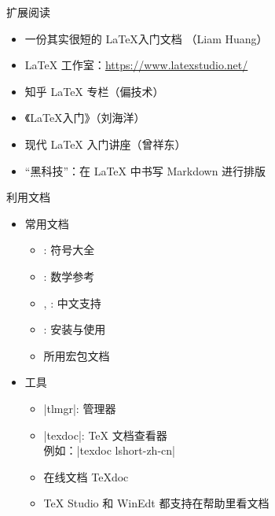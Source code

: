 \begin{frame}{扩展阅读}
  \begin{itemize}
    \item 一份其实很短的 \LaTeX 入门文档 （Liam Huang） 
    \item \LaTeX{} 工作室：\url{https://www.latexstudio.net/}
    \item 知乎 \LaTeX{} 专栏（偏技术）
    \item 《\LaTeX{}入门》（刘海洋）
    \item 现代 LaTeX 入门讲座（曾祥东）
    \item “黑科技”：在 \LaTeX{} 中书写 Markdown 进行排版 
  \end{itemize}
\end{frame}


\begin{frame}[fragile]{利用文档}
  \begin{itemize}
    \item 常用文档
      \begin{itemize}
        \item {}: 符号大全
        \item {}: 数学参考
        \item {}, : 中文支持
        \item {}: \TL 安装与使用
        \item 所用宏包文档
      \end{itemize}
    \item 工具
      \begin{itemize}
        \item |tlmgr|: \TL 管理器
        \item |texdoc|: \TeX{} 文档查看器\\
          例如：|texdoc lshort-zh-cn|
        \item 在线文档 \TeX{}doc 
        \item TeX Studio 和 WinEdt 都支持在帮助里看文档
      \end{itemize}
  \end{itemize}
\end{frame}

